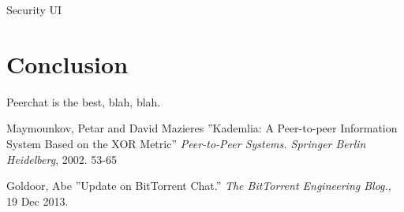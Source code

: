 \documentclass{article}
\begin{document}
Security
UI

\section{Conclusion}

Peerchat is the best, blah, blah.

\begin{thebibliography}{99}
   Maymounkov, Petar and David Mazieres
   ''Kademlia: A Peer-to-peer Information System Based on the XOR Metric''
   \textit{Peer-to-Peer Systems. Springer Berlin Heidelberg}, 2002. 53-65

	Goldoor, Abe
	''Update on BitTorrent Chat.''
	\textit{The BitTorrent Engineering Blog.}, 19 Dec 2013.

\end{thebibliography}
\end{document}
